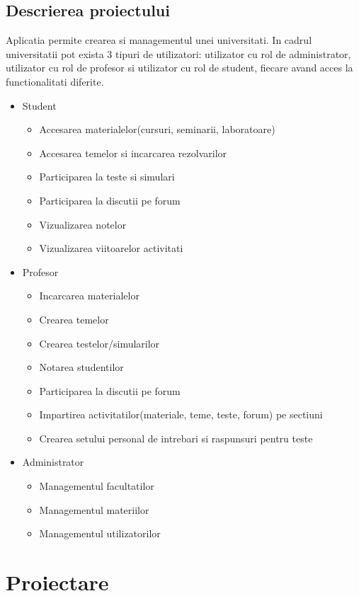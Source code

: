 \documentclass[12pt, a4paper, oneside, romanian]{teza-upb}
\begin{document}
\section{Descrierea proiectului}

Aplicatia permite crearea si managementul unei universitati. In cadrul universitatii pot exista 3 tipuri de utilizatori: utilizator cu rol de administrator, utilizator cu rol de profesor si utilizator cu rol de student, fiecare avand acces la functionalitati diferite.
\begin{itemize}
	\item Student
		\begin{itemize}
			\item Accesarea materialelor(cursuri, seminarii, laboratoare)
			\item Accesarea temelor si incarcarea rezolvarilor
			\item Participarea la teste si simulari
			\item Participarea la discutii pe forum
			\item Vizualizarea notelor
			\item Vizualizarea viitoarelor activitati
		\end{itemize}
	\item Profesor
		\begin{itemize}
			\item Incarcarea materialelor
			\item Crearea temelor
			\item Crearea testelor/simularilor
			\item Notarea studentilor
			\item Participarea la discutii pe forum
			\item Impartirea activitatilor(materiale, teme, teste, forum) pe sectiuni
			\item Crearea setului personal de intrebari si raspunsuri pentru teste
		\end{itemize}
	\item Administrator
		\begin{itemize}
			\item Managementul facultatilor
			\item Managementul materiilor
			\item Managementul utilizatorilor
		\end{itemize}
\end{itemize}

\chapter{Proiectare}
\end{document}
